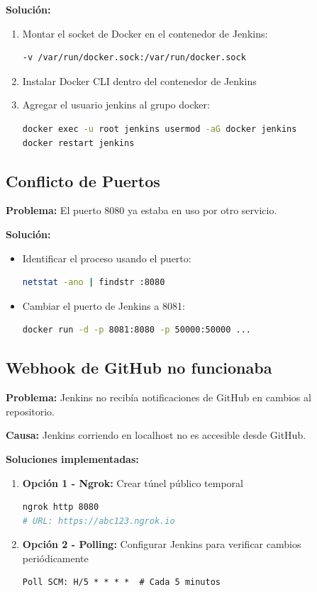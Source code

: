 \documentclass[12pt,a4paper]{article}
\begin{document}
\textbf{Solución:}
\begin{enumerate}
    \item Montar el socket de Docker en el contenedor de Jenkins:
    \begin{lstlisting}[language=bash]
-v /var/run/docker.sock:/var/run/docker.sock
    \end{lstlisting}
    
    \item Instalar Docker CLI dentro del contenedor de Jenkins
    
    \item Agregar el usuario jenkins al grupo docker:
    \begin{lstlisting}[language=bash]
docker exec -u root jenkins usermod -aG docker jenkins
docker restart jenkins
    \end{lstlisting}
\end{enumerate}

\subsection{Conflicto de Puertos}

\textbf{Problema:} El puerto 8080 ya estaba en uso por otro servicio.

\textbf{Solución:}
\begin{itemize}
    \item Identificar el proceso usando el puerto:
    \begin{lstlisting}[language=bash]
netstat -ano | findstr :8080
    \end{lstlisting}
    
    \item Cambiar el puerto de Jenkins a 8081:
    \begin{lstlisting}[language=bash]
docker run -d -p 8081:8080 -p 50000:50000 ...
    \end{lstlisting}
\end{itemize}

\subsection{Webhook de GitHub no funcionaba}

\textbf{Problema:} Jenkins no recibía notificaciones de GitHub en cambios al repositorio.

\textbf{Causa:} Jenkins corriendo en localhost no es accesible desde GitHub.

\textbf{Soluciones implementadas:}
\begin{enumerate}
    \item \textbf{Opción 1 - Ngrok:} Crear túnel público temporal
    \begin{lstlisting}[language=bash]
ngrok http 8080
# URL: https://abc123.ngrok.io
    \end{lstlisting}
    
    \item \textbf{Opción 2 - Polling:} Configurar Jenkins para verificar cambios periódicamente
    \begin{lstlisting}
Poll SCM: H/5 * * * *  # Cada 5 minutos
    \end{lstlisting}
\end{enumerate}
\end{document}
